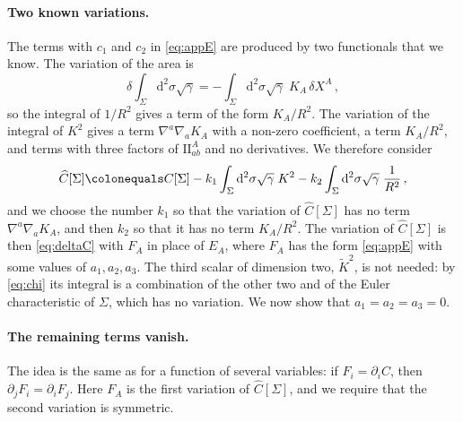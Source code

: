 \documentclass[a4paper,11pt]{article}
\newcommand{\II}{\mathrm{I\!I}}
\newcommand{\Kt}{\widetilde{K}}
\newcommand{\dd}{\mathrm{d}}
\begin{document}
\paragraph{Two known variations.}
The terms with $c_1$ and $c_2$ in \eqref{eq:appE} are produced by two functionals that we know. The variation of the area is
\begin{equation}
	\delta\int_\Sigma\dd^2\sigma\sqrt\gamma=-\int_\Sigma\dd^2\sigma\sqrt\gamma\;K_A\,\delta X^A\, ,
\end{equation}
so the integral of $1/R^2$ gives a term of the form $K_A/R^2$. The variation of the integral of $K^2$ gives a term $\nabla^a\nabla_aK_A$ with a non-zero coefficient, a term $K_A/R^2$, and terms with three factors of $\II^A_{ab}$ and no derivatives. We therefore consider
\begin{equation}\label{eq:appChat}
	\widehat C[\Sigma]\colonequals C[\Sigma]-k_1\int_\Sigma\dd^2\sigma\sqrt\gamma\;K^2-k_2\int_\Sigma\dd^2\sigma\sqrt\gamma\;\frac{1}{R^2}\, ,
\end{equation}
and we choose the number $k_1$ so that the variation of $\widehat C[\Sigma]$ has no term $\nabla^a\nabla_aK_A$, and then $k_2$ so that it has no term $K_A/R^2$. The variation of $\widehat C[\Sigma]$ is then \eqref{eq:deltaC} with $F_A$ in place of $E_A$, where $F_A$ has the form \eqref{eq:appE} with some values of $a_1,a_2,a_3$. The third scalar of dimension two, $\Kt^2$, is not needed: by \eqref{eq:chi} its integral is a combination of the other two and of the Euler characteristic of $\Sigma$, which has no variation. We now show that $a_1=a_2=a_3=0$.

\paragraph{The remaining terms vanish.}
The idea is the same as for a function of several variables: if $F_i=\partial_iC$, then $\partial_jF_i=\partial_iF_j$. Here $F_A$ is the first variation of $\widehat C[\Sigma]$, and we require that the second variation is symmetric.
\end{document}
